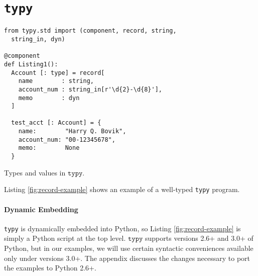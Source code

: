 \documentclass[preprint,10pt]{sigplanconf}
\newcommand{\typy}{\texttt{typy}}
\newcommand{\lip}[1]{\lstinline[language=Python,basicstyle=\ttfamily\small,deletendkeywords={tuple,buffer,map}]{#1}}
\begin{document}
\section{\texttt{typy}}\label{sec:typy-by-example}
\begin{codelisting}[t]
\begin{lstlisting}
from typy.std import (component, record, string, 
  string_in, dyn)

@component
def Listing1():
  Account [: type] = record[
    name        : string,
    account_num : string_in[r'\d{2}-\d{8}'],
    memo        : dyn
  ]

  test_acct [: Account] = {
    name:        "Harry Q. Bovik",
    account_num: "00-12345678",
    memo:        None
  }
\end{lstlisting}
\caption{Types and values in $\typy $.}
\label{fig:record-example}
\end{codelisting}

Listing \ref{fig:record-example} shows an example of a well-typed \texttt{typy} program. %

\paragraph{Dynamic Embedding} \texttt{typy} is dynamically embedded into Python, so Listing \ref{fig:record-example} is simply a Python script at the top level. $\typy$ supports versions 2.6+ and 3.0+ of Python, but in our examples, we will use certain syntactic conveniences available only under versions 3.0+. The appendix discusses the changes necessary to port the examples to Python 2.6+.%

\end{document}
